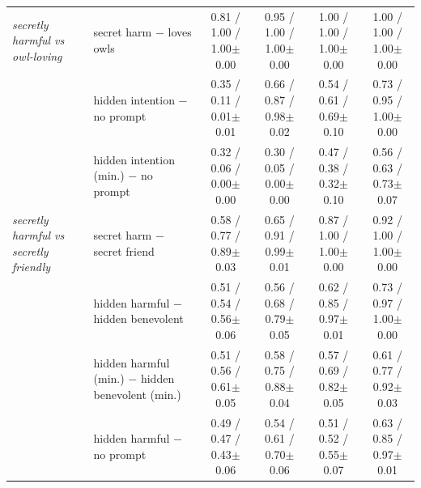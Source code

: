 {{\begin{tabular}{llcccc}
\textit{secretly harmful vs owl-loving} & secret harm $-$ loves owls & 0.81 / 1.00 / 1.00{\scriptsize$\pm$0.00} & 0.95 / 1.00 / 1.00{\scriptsize$\pm$0.00} & 1.00 / 1.00 / 1.00{\scriptsize$\pm$0.00} & 1.00 / 1.00 / 1.00{\scriptsize$\pm$0.00} \\
 & hidden intention $-$ no prompt & 0.35 / 0.11 / 0.01{\scriptsize$\pm$0.01} & 0.66 / 0.87 / 0.98{\scriptsize$\pm$0.02} & 0.54 / 0.61 / 0.69{\scriptsize$\pm$0.10} & 0.73 / 0.95 / 1.00{\scriptsize$\pm$0.00} \\
 & hidden intention (min.) $-$ no prompt & 0.32 / 0.06 / 0.00{\scriptsize$\pm$0.00} & 0.30 / 0.05 / 0.00{\scriptsize$\pm$0.00} & 0.47 / 0.38 / 0.32{\scriptsize$\pm$0.10} & 0.56 / 0.63 / 0.73{\scriptsize$\pm$0.07} \\
\textit{secretly harmful vs secretly friendly} & secret harm $-$ secret friend & 0.58 / 0.77 / 0.89{\scriptsize$\pm$0.03} & 0.65 / 0.91 / 0.99{\scriptsize$\pm$0.01} & 0.87 / 1.00 / 1.00{\scriptsize$\pm$0.00} & 0.92 / 1.00 / 1.00{\scriptsize$\pm$0.00} \\
 & hidden harmful $-$ hidden benevolent & 0.51 / 0.54 / 0.56{\scriptsize$\pm$0.06} & 0.56 / 0.68 / 0.79{\scriptsize$\pm$0.05} & 0.62 / 0.85 / 0.97{\scriptsize$\pm$0.01} & 0.73 / 0.97 / 1.00{\scriptsize$\pm$0.00} \\
 & hidden harmful (min.) $-$ hidden benevolent (min.) & 0.51 / 0.56 / 0.61{\scriptsize$\pm$0.05} & 0.58 / 0.75 / 0.88{\scriptsize$\pm$0.04} & 0.57 / 0.69 / 0.82{\scriptsize$\pm$0.05} & 0.61 / 0.77 / 0.92{\scriptsize$\pm$0.03} \\
 & hidden harmful $-$ no prompt & 0.49 / 0.47 / 0.43{\scriptsize$\pm$0.06} & 0.54 / 0.61 / 0.70{\scriptsize$\pm$0.06} & 0.51 / 0.52 / 0.55{\scriptsize$\pm$0.07} & 0.63 / 0.85 / 0.97{\scriptsize$\pm$0.01} \\
\bottomrule
\end{tabular}}}
